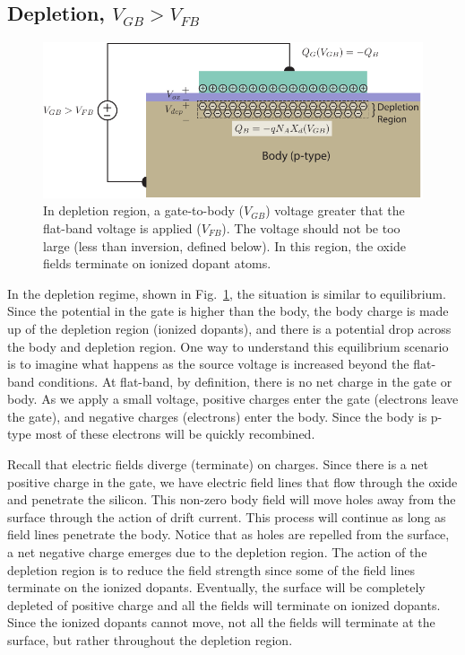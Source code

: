 \subsection{Depletion, $V_{GB} > V_{FB}$}
\begin{figure}[tbh]
\begin{center}
\includegraphics[width=.75\columnwidth]{mos_cap_depletion}
\end{center}
\caption{In depletion region, a gate-to-body ($V_{GB}$) voltage greater that the flat-band voltage is applied ($V_{FB}$).  The voltage should not be too large (less than inversion, defined below).  In this region, the oxide fields terminate on ionized dopant atoms.}
\label{fig:mos_dep}
\end{figure}

In the depletion regime, shown in Fig.~\ref{fig:mos_dep}, the situation is similar to equilibrium.  Since the potential in the gate is higher than the body, the body charge is made up of the depletion region (ionized dopants), and there is a potential drop across the body and depletion region.  One way to understand this equilibrium scenario is to imagine what happens as the source voltage is increased beyond the flat-band conditions.  At flat-band, by definition, there is no net charge in the gate or body.  As we apply a small voltage, positive charges enter the gate (electrons leave the gate), and negative charges (electrons) enter the body. Since the body is p-type most of these electrons will be quickly recombined.  

Recall that electric fields diverge (terminate) on charges.  Since there is a net positive charge in the gate, we have electric field lines that flow through the oxide and penetrate the silicon.  This non-zero body field will move holes away from the surface through the action of drift current.  This process will continue as long as field lines penetrate the body.   Notice that as holes are repelled from the surface, a net negative charge emerges due to the depletion region.  The action of the depletion region is to reduce the field strength since some of the field lines terminate on the ionized dopants.  Eventually, the surface will be completely depleted of positive charge and all the fields will terminate on ionized dopants.  Since the ionized dopants cannot move, not all the fields will terminate at the surface, but rather throughout the depletion region.  
